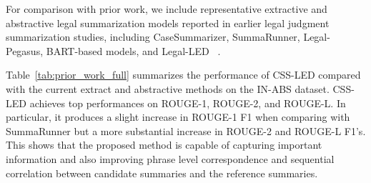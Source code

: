 \documentclass[11pt, a4paper]{article}
\theoremstyle{plain}%
\theoremstyle{remark}%
\theoremstyle{definition}%
\begin{document}
\begin{table}[H]
\centering
\caption{Comparison with Prior Work on IN-ABS (ROUGE Precision, Recall, and F1)}
\label{tab:prior_work_full}
\end{table}

For comparison with prior work, we include representative extractive and abstractive legal summarization models reported in earlier legal judgment summarization studies, including CaseSummarizer, SummaRunner, Legal-Pegasus, BART-based models, and Legal-LED ~\cite{b1, b2, b4, b8, b10, b21, b36}.


Table~\ref{tab:prior_work_full} summarizes the performance of CSS-LED compared with the current extract and abstractive methods on the IN-ABS dataset. CSS-LED achieves top performances on ROUGE-1, ROUGE-2, and ROUGE-L. In particular, it produces a slight increase in ROUGE-1 F1 when comparing with SummaRunner but a more substantial increase in ROUGE-2 and ROUGE-L F1's. This shows that the proposed method is capable of capturing important information and also improving phrase level correspondence and sequential correlation between candidate summaries and the reference summaries.
\end{document}
